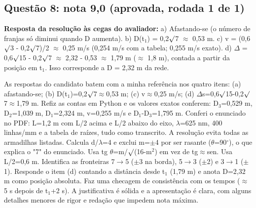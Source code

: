 \documentclass{article}%
\begin{document}
\subsection*{Questão 8: nota 9,0 (aprovada, rodada 1 de 1)}%
\textbf{Resposta da resolução às cegas do avaliador:} a) Afastando{-}se (o número de franjas só diminui quando D aumenta).\newline%
b) D(t$_{1}$) = 0,2$\surd$7 $\approx$ 0,53 m.\newline%
c) v = (0,6$\surd$3 - 0,2$\surd$7)/2 $\approx$ 0,25 m/s (0,254 m/s com a tabela; 0,255 m/s exato).\newline%
d) $\Delta$ = 0,6$\surd$15 - 0,2$\surd$7 $\approx$ 2,32 - 0,53 $\approx$ 1,79 m ($\approx$ 1,8 m), contada a partir da posição em t$_{1}$. Isso corresponde a D = 2,32 m da rede.\par %
As respostas do candidato batem com a minha referência nos quatro itens: (a) afastando{-}se; (b) D(t$_{1}$)=0,2$\surd$7$\approx$0,53 m; (c) v$\approx$0,25 m/s; (d) $\Delta$s=0,6$\surd$15-0,2$\surd$7$\approx$1,79 m. Refiz as contas em Python e os valores exatos conferem: D$_{3}$=0,529 m, D$_{2}$=1,039 m, D$_{1}$=2,324 m, v=0,255 m/s e D$_{1}$-D$_{3}$=1,795 m. Conferi o enunciado no PDF: L=1,2 m com L/2 acima e L/2 abaixo do eixo, $\lambda$=625 nm, 400 linhas/mm e a tabela de raízes, tudo como transcrito. A resolução evita todas as armadilhas listadas. Calcula d/$\lambda$=4 e exclui m=$\pm$4 por ser rasante ($\theta$=90$^\circ$), o que explica o "7" do enunciado. Usa tg $\theta$=m/$\surd$(16-m$^2$) em vez de tg$\approx$sen. Usa L/2=0,6 m. Identifica as fronteiras 7$\to$5 ($\pm$3 na borda), 5$\to$3 ($\pm$2) e 3$\to$1 ($\pm$1). Responde o item (d) contando a distância desde t$_{1}$ (1,79 m) e anota D=2,32 m como posição absoluta. Faz uma checagem de consistência com os tempos ($\approx$5 s depois de t$_{1}$+2 s). A justificativa é sólida e a apresentação é clara, com alguns detalhes menores de rigor e redação que impedem nota máxima.%
\end{document}
